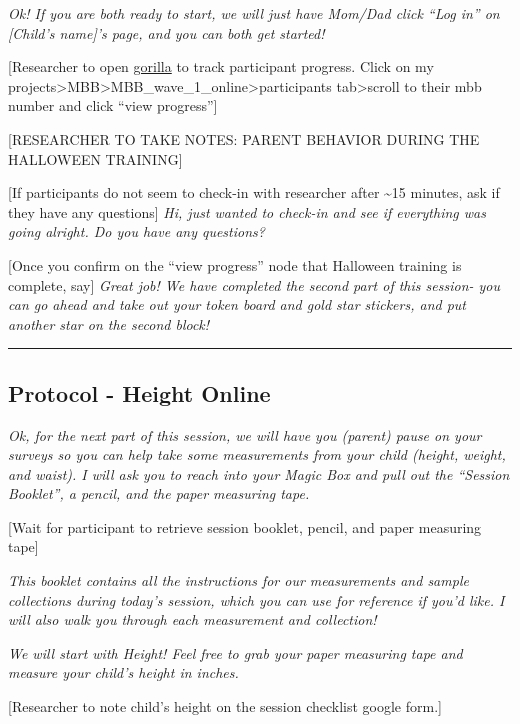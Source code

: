 \documentclass[]{book}
\begin{document}
\emph{Ok! If you are both ready to start, we will just have Mom/Dad click ``Log in'' on {[}Child's name{]}'s page, and you can both get started!}

{[}Researcher to open \href{https://gorilla.sc}{gorilla} to track participant progress. Click on my projects\textgreater{}MBB\textgreater{}MBB\_wave\_1\_online\textgreater{}participants tab\textgreater{}scroll to their mbb number and click ``view progress''{]}

{[}RESEARCHER TO TAKE NOTES: PARENT BEHAVIOR DURING THE HALLOWEEN TRAINING{]}

{[}If participants do not seem to check-in with researcher after \textasciitilde{}15 minutes, ask if they have any questions{]} \emph{Hi, just wanted to check-in and see if everything was going alright. Do you have any questions?}

{[}Once you confirm on the ``view progress'' node that Halloween training is complete, say{]} \emph{Great job! We have completed the second part of this session- you can go ahead and take out your token board and gold star stickers, and put another star on the second block!}

\begin{center}\rule{0.5\linewidth}{0.5pt}\end{center}

\hypertarget{protocol---height-online}{%
\subsection{Protocol - Height Online}\label{protocol---height-online}}

\emph{Ok, for the next part of this session, we will have you (parent) pause on your surveys so you can help take some measurements from your child (height, weight, and waist). I will ask you to reach into your Magic Box and pull out the ``Session Booklet'', a pencil, and the paper measuring tape.}

{[}Wait for participant to retrieve session booklet, pencil, and paper measuring tape{]}

\emph{This booklet contains all the instructions for our measurements and sample collections during today's session, which you can use for reference if you'd like. I will also walk you through each measurement and collection!}

\emph{We will start with Height! Feel free to grab your paper measuring tape and measure your child's height in inches.}

{[}Researcher to note child's height on the session checklist google form.{]}
\end{document}
